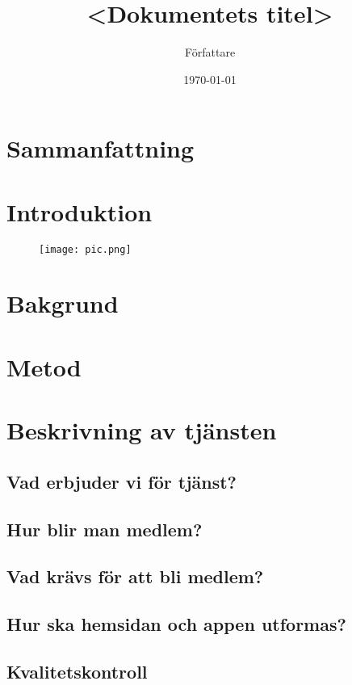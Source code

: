 \documentclass[10pt,a4paper,oneside]{article}
\title{<Dokumentets titel>}
\author{Författare}
\date{\today}
\begin{document}
\maketitle
\newpage

\section{Sammanfattning}
\cite{test1}
\newpage

\tableofcontents
\newpage

\section{Introduktion}

\begin{figure}[H]
	\texttt{[image: pic.png]}
\end{figure}

\newpage

\section{Bakgrund}
\newpage

\section{Metod}
\newpage

\section{Beskrivning av tjänsten}
\subsection{Vad erbjuder vi för tjänst?}
\subsection{Hur blir man medlem?}
\subsection{Vad krävs för att bli medlem?}
\subsection{Hur ska hemsidan och appen utformas?}
\subsection{Kvalitetskontroll}
\end{document}
